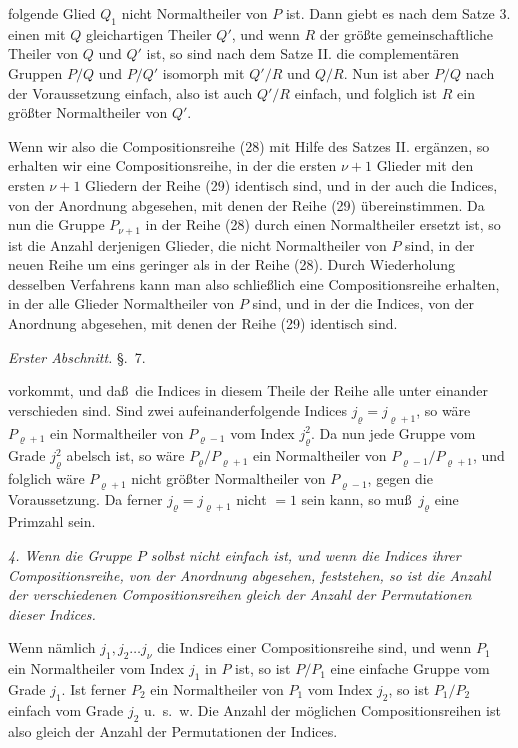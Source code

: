 \documentclass[12pt,a4paper]{book}
\begin{document}
\vspace{0.3cm}

folgende Glied $Q_1$ nicht Normaltheiler von $P$ ist. Dann giebt es nach dem Satze 3. einen mit $Q$ gleichartigen Theiler $Q'$, und wenn $R$ der gr\"o\ss te gemeinschaftliche Theiler von $Q$ und $Q'$ ist, so sind nach dem Satze II. die complement\"aren Gruppen $P/Q$ und $P/Q'$ isomorph mit $Q'/R$ und $Q/R$. Nun ist aber $P/Q$ nach der Voraussetzung einfach, also ist auch $Q'/R$ einfach, und folglich ist $R$ ein gr\"o\ss ter Normaltheiler von $Q'$.

Wenn wir also die Compositionsreihe (28) mit Hilfe des Satzes II. erg\"anzen, so erhalten wir eine Compositionsreihe, in der die ersten $\nu + 1$ Glieder mit den ersten $\nu + 1$ Gliedern der Reihe (29) identisch sind, und in der auch die Indices, von der Anordnung abgesehen, mit denen der Reihe (29) \"ubereinstimmen. Da nun die Gruppe $P_{\nu+1}$ in der Reihe (28) durch einen Normaltheiler ersetzt ist, so ist die Anzahl derjenigen Glieder, die nicht Normaltheiler von $P$ sind, in der neuen Reihe um eins geringer als in der Reihe (28). Durch Wiederholung desselben Verfahrens kann man also schlie\ss lich eine Compositionsreihe erhalten, in der alle Glieder Normaltheiler von $P$ sind, und in der die Indices, von der Anordnung abgesehen, mit denen der Reihe (29) identisch sind.

\newpage
{} \hfill \textit{Erster Abschnitt.} \hfill \S.~7.

\vspace{0.3cm}

vorkommt, und da\ss\ die Indices in diesem Theile der Reihe alle unter einander verschieden sind. Sind zwei aufeinanderfolgende Indices $j_\varrho = j_{\varrho+1}$, so w\"are $P_{\varrho+1}$ ein Normaltheiler von $P_{\varrho-1}$ vom Index $j_\varrho^2$. Da nun jede Gruppe vom Grade $j_\varrho^2$ abelsch ist, so w\"are $P_\varrho/P_{\varrho+1}$ ein Normaltheiler von $P_{\varrho-1}/P_{\varrho+1}$, und folglich w\"are $P_{\varrho+1}$ nicht gr\"o\ss ter Normaltheiler von $P_{\varrho-1}$, gegen die Voraussetzung. Da ferner $j_\varrho = j_{\varrho+1}$ nicht $= 1$ sein kann, so mu\ss\ $j_\varrho$ eine Primzahl sein.

\textit{4. Wenn die Gruppe $P$ solbst nicht einfach ist, und wenn die Indices ihrer Compositionsreihe, von der Anordnung abgesehen, feststehen, so ist die Anzahl der verschiedenen Compositionsreihen gleich der Anzahl der Permutationen dieser Indices.}

Wenn n\"amlich $j_1, j_2 \ldots j_\nu$ die Indices einer Compositionsreihe sind, und wenn $P_1$ ein Normaltheiler vom Index $j_1$ in $P$ ist, so ist $P/P_1$ eine einfache Gruppe vom Grade $j_1$. Ist ferner $P_2$ ein Normaltheiler von $P_1$ vom Index $j_2$, so ist $P_1/P_2$ einfach vom Grade $j_2$ u.~s.~w. Die Anzahl der m\"oglichen Compositionsreihen ist also gleich der Anzahl der Permutationen der Indices.
\end{document}

